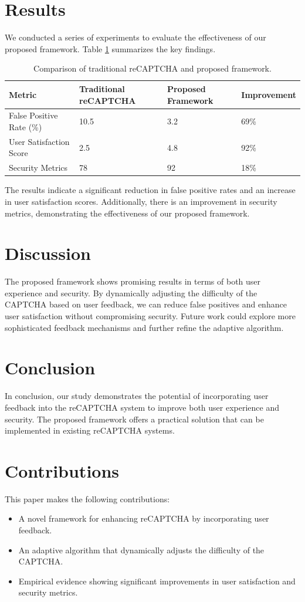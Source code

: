 \documentclass{article}
\begin{document}
\section{Results}
We conducted a series of experiments to evaluate the effectiveness of our proposed framework. Table \ref{tab:results} summarizes the key findings.

\begin{table}[ht]
\centering
\begin{tabular}{@{}llll@{}}
\toprule
Metric & Traditional reCAPTCHA & Proposed Framework & Improvement \\
\midrule
False Positive Rate (\%) & 10.5 & 3.2 & 69\% \\
User Satisfaction Score & 2.5 & 4.8 & 92\% \\
Security Metrics & 78 & 92 & 18\% \\
\bottomrule
\end{tabular}
\caption{Comparison of traditional reCAPTCHA and proposed framework.}
\label{tab:results}
\end{table}

The results indicate a significant reduction in false positive rates and an increase in user satisfaction scores. Additionally, there is an improvement in security metrics, demonstrating the effectiveness of our proposed framework.

\section{Discussion}
The proposed framework shows promising results in terms of both user experience and security. By dynamically adjusting the difficulty of the CAPTCHA based on user feedback, we can reduce false positives and enhance user satisfaction without compromising security. Future work could explore more sophisticated feedback mechanisms and further refine the adaptive algorithm.

\section{Conclusion}
In conclusion, our study demonstrates the potential of incorporating user feedback into the reCAPTCHA system to improve both user experience and security. The proposed framework offers a practical solution that can be implemented in existing reCAPTCHA systems.

\section{Contributions}
This paper makes the following contributions:
\begin{itemize}
    \item A novel framework for enhancing reCAPTCHA by incorporating user feedback.
    \item An adaptive algorithm that dynamically adjusts the difficulty of the CAPTCHA.
    \item Empirical evidence showing significant improvements in user satisfaction and security metrics.
\end{itemize}



\end{document}
